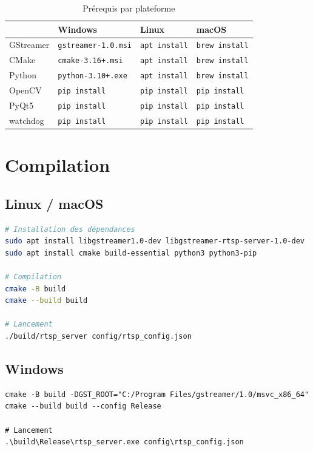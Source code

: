 \documentclass[12pt,a4paper]{report}
\newcommand{\code}[1]{\texttt{#1}}
\begin{document}
\begin{table}[H]
    \centering
    \caption{Prérequis par plateforme}
    \label{tab:prerequis}
    \begin{tabular}{|l|l|l|l|}
        \hline
        \rowcolor{primaryBlue!80}
        \multicolumn{1}{|c|}{\color{white}\textbf{Composant}} & 
        \color{white}\textbf{Windows} & 
        \color{white}\textbf{Linux} & 
        \color{white}\textbf{macOS} \\
        \hline
        GStreamer & \code{gstreamer-1.0.msi} & \code{apt install} & \code{brew install} \\
        CMake & \code{cmake-3.16+.msi} & \code{apt install} & \code{brew install} \\
        Python & \code{python-3.10+.exe} & \code{apt install} & \code{brew install} \\
        OpenCV & \code{pip install} & \code{pip install} & \code{pip install} \\
        PyQt5 & \code{pip install} & \code{pip install} & \code{pip install} \\
        watchdog & \code{pip install} & \code{pip install} & \code{pip install} \\
        \hline
    \end{tabular}
\end{table}

\section{Compilation}

\subsection{Linux / macOS}
\begin{lstlisting}[language=bash, caption=Compilation sous Linux/macOS]
# Installation des dépendances
sudo apt install libgstreamer1.0-dev libgstreamer-rtsp-server-1.0-dev
sudo apt install cmake build-essential python3 python3-pip

# Compilation
cmake -B build
cmake --build build

# Lancement
./build/rtsp_server config/rtsp_config.json
\end{lstlisting}

\subsection{Windows}
\begin{lstlisting}[language=batch, caption=Compilation sous Windows]
cmake -B build -DGST_ROOT="C:/Program Files/gstreamer/1.0/msvc_x86_64"
cmake --build build --config Release

# Lancement
.\build\Release\rtsp_server.exe config\rtsp_config.json
\end{lstlisting}
\end{document}
